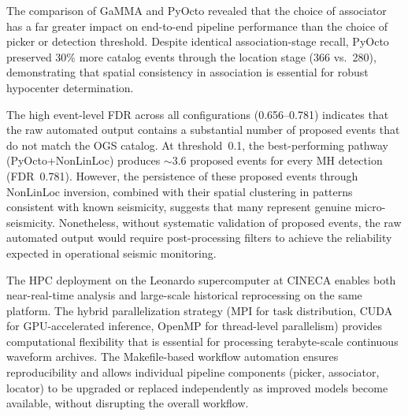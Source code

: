 The comparison of GaMMA and PyOcto revealed that the choice of associator
has a far greater impact on end-to-end pipeline performance than the choice
of picker or detection threshold. Despite identical association-stage recall,
PyOcto preserved 30\% more catalog events through the location stage (366 vs.\
280), demonstrating that spatial consistency in association is essential for
robust hypocenter determination.

The high event-level \ac{FDR} across all configurations (0.656--0.781)
indicates that the raw automated output contains a substantial number of
proposed events that do not match the OGS catalog. At threshold~0.1, the
best-performing pathway (PyOcto+NonLinLoc) produces $\sim$3.6 proposed events
for every MH detection (\ac{FDR}~0.781). However, the persistence of these
proposed events through NonLinLoc inversion, combined with their spatial
clustering in patterns consistent with known seismicity, suggests that many
represent genuine micro-seismicity. Nonetheless, without systematic validation
of proposed events, the raw automated output would require post-processing
filters to achieve the reliability expected in operational seismic monitoring.

The \ac{HPC} deployment on the Leonardo supercomputer at CINECA enables both
near-real-time analysis and large-scale historical reprocessing on the same
platform. The hybrid parallelization strategy (MPI for task distribution,
CUDA for GPU-accelerated inference, OpenMP for thread-level parallelism)
provides computational flexibility that is essential for processing
terabyte-scale continuous waveform archives. The Makefile-based workflow
automation ensures reproducibility and allows individual pipeline components
(picker, associator, locator) to be upgraded or replaced independently as
improved models become available, without disrupting the overall workflow.

